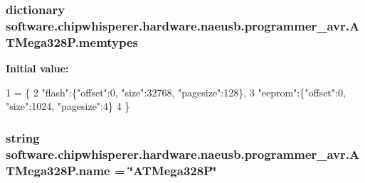 \subsubsection[{memtypes}]{\setlength{\rightskip}{0pt plus 5cm}dictionary software.\+chipwhisperer.\+hardware.\+naeusb.\+programmer\+\_\+avr.\+A\+T\+Mega328\+P.\+memtypes\hspace{0.3cm}{\ttfamily [static]}}\label{classsoftware_1_1chipwhisperer_1_1hardware_1_1naeusb_1_1programmer__avr_1_1ATMega328P_a54c1fe1122135857f90b8c2fddbd2c5f}
{\bfseries Initial value\+:}
\begin{DoxyCode}
1 = \{
2        \textcolor{stringliteral}{"flash"}:\{\textcolor{stringliteral}{"offset"}:0, \textcolor{stringliteral}{"size"}:32768, \textcolor{stringliteral}{"pagesize"}:128\},
3        \textcolor{stringliteral}{"eeprom"}:\{\textcolor{stringliteral}{"offset"}:0, \textcolor{stringliteral}{"size"}:1024, \textcolor{stringliteral}{"pagesize"}:4\}
4      \}
\end{DoxyCode}
\hypertarget{classsoftware_1_1chipwhisperer_1_1hardware_1_1naeusb_1_1programmer__avr_1_1ATMega328P_a1f6e013caee19748d565156c6daec1e0}{}
\subsubsection[{name}]{\setlength{\rightskip}{0pt plus 5cm}string software.\+chipwhisperer.\+hardware.\+naeusb.\+programmer\+\_\+avr.\+A\+T\+Mega328\+P.\+name = \char`\"{}A\+T\+Mega328\+P\char`\"{}\hspace{0.3cm}{\ttfamily [static]}}\label{classsoftware_1_1chipwhisperer_1_1hardware_1_1naeusb_1_1programmer__avr_1_1ATMega328P_a1f6e013caee19748d565156c6daec1e0}
\hypertarget{classsoftware_1_1chipwhisperer_1_1hardware_1_1naeusb_1_1programmer__avr_1_1ATMega328P_ad2acca9d8a96148c76e3d8997eea70cb}{}
